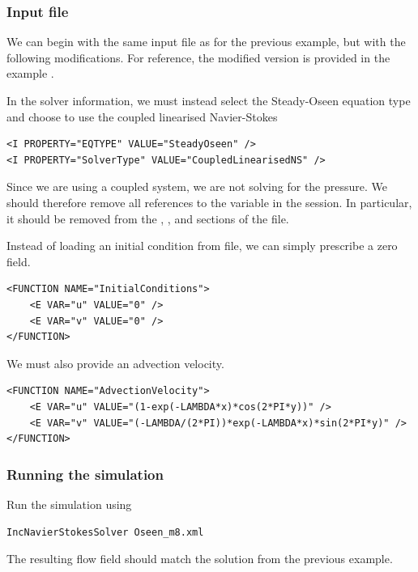 \subsubsection{Input file}
We can begin with the same input file as for the previous example, but with the
following modifications. For reference, the modified version is provided in the
example .

In the solver information, we must instead select the
Steady-Oseen equation type and choose to use the coupled linearised
Navier-Stokes
\begin{lstlisting}[style=XMLStyle]
<I PROPERTY="EQTYPE" VALUE="SteadyOseen" />
<I PROPERTY="SolverType" VALUE="CoupledLinearisedNS" />
\end{lstlisting}

\begin{notebox}
Since we are using a coupled system, we are not solving for the pressure. We
should therefore remove all references to the variable  in the session.
In particular, it should be removed from the ,
,  and  sections of
the file.
\end{notebox}

Instead of loading an initial condition from file, we can simply prescribe a
zero field.
\begin{lstlisting}[style=XMLStyle]
<FUNCTION NAME="InitialConditions">
    <E VAR="u" VALUE="0" />
    <E VAR="v" VALUE="0" />
</FUNCTION>
\end{lstlisting}

We must also provide an advection velocity.
\begin{lstlisting}[style=XMLStyle]
<FUNCTION NAME="AdvectionVelocity">
    <E VAR="u" VALUE="(1-exp(-LAMBDA*x)*cos(2*PI*y))" />
    <E VAR="v" VALUE="(-LAMBDA/(2*PI))*exp(-LAMBDA*x)*sin(2*PI*y)" />
</FUNCTION>
\end{lstlisting}

\subsubsection{Running the simulation}
Run the simulation using
\begin{lstlisting}[style=BashInputStyle]
IncNavierStokesSolver Oseen_m8.xml
\end{lstlisting}

The resulting flow field should match the solution from the previous example.


